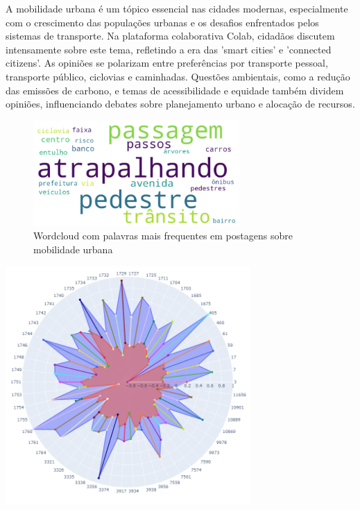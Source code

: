 A mobilidade urbana é um tópico essencial nas cidades modernas, especialmente com o crescimento das populações urbanas e os desafios enfrentados pelos sistemas de transporte. Na plataforma colaborativa Colab, cidadãos discutem intensamente sobre este tema, refletindo a era das 'smart cities' e 'connected citizens'. As opiniões se polarizam entre preferências por transporte pessoal, transporte público, ciclovias e caminhadas. Questões ambientais, como a redução das emissões de carbono, e temas de acessibilidade e equidade também dividem opiniões, influenciando debates sobre planejamento urbano e alocação de recursos.

\begin{figure}[htb]
	\centering
	\includegraphics[width=0.7\textwidth]{images/wordcloud_mobility.png}
	\caption{Wordcloud com palavras mais frequentes em postagens sobre mobilidade urbana}
	\label{fig:wordcloud_mobility}
\end{figure}

\begin{quadro}[htb]
	\centering
	\includegraphics[width=0.7\textwidth]{images/social_barometer_mobility.png}
	\caption{Gráfico de Radar ilustrando a pressão social em relação à mobilidade urbana. O eixo radial mostra os scores de sentimentos (plano vermelho) e personas (plano azul), enquanto os segmentos descrevem diversos eventos urbanos.}
	\label{fig:social_barometer_mobility}
\end{quadro}

